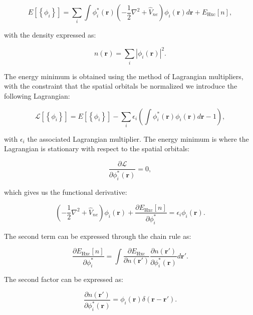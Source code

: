 \begin{equation}
    E[\left\{\phi_i\right\}]
    = \sum_i \int \phi_i^* (\bm{r}) (-\frac{1}{2} \nabla^2 + \hat{V}_{ne})
        \phi_i(\bm{r}) d\bm{r} + E_{\text{Hxc}}[n] ,
\end{equation}

with the density expressed as:

\begin{equation}
    n(\bm{r}) = \sum_i \left| \phi_i(\bm{r}) \right|^2 .
\end{equation}

The energy minimum is obtained using the method of Lagrangian multipliers,
with the constraint that the spatial orbitals be normalized
we introduce the following Lagrangian:

\begin{equation}
 \mathcal{L} [\left\{\phi_i\right\}]
    = E[\left\{\phi_i\right\}] - \sum_i \epsilon_i
    \left( \int \phi_i^* (\bm{r}) \phi_i(\bm{r}) d\bm{r} - 1 \right) ,
\end{equation}

with $\epsilon_i$ the associated Lagrangian multiplier.
The energy minimum is where the Lagrangian is stationary
with respect to the spatial orbitals:

\begin{equation}
 \frac{\partial \mathcal{L}}{\partial \phi_i^* (\bm{r})} = 0 ,
\end{equation}

which gives us the functional derivative:

\begin{equation}
 \left( -\frac{1}{2} \nabla^2 + \hat{V}_{ne} \right) \phi_i(\bm{r})
    + \frac{\partial E_{\text{Hxc}}[n]}{\partial \phi_i^*}
    = \epsilon_i \phi_i(\bm{r}) .
\end{equation}

The second term can be expressed through the chain rule as:

\begin{equation}
 \frac{\partial E_{\text{Hxc}}[n]}{\partial \phi_i^*} =
    \int \frac{\partial E_{\text{Hxc}}}{\partial n(\bm{r}')}
    \frac{\partial n(\bm{r}')}{\partial \phi_i^*(\bm{r})} d\bm{r}' .
\end{equation}

The second factor can be expressed as:

\begin{equation}
 \frac{\partial n(\bm{r}')}{\partial \phi_i^*(\bm{r})}
    = \phi_i(\bm{r}) \delta (\bm{r} - \bm{r}') .
\end{equation}

